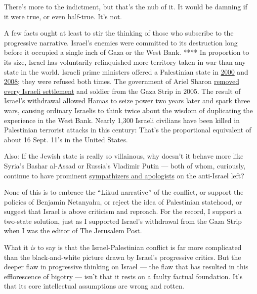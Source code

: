 There's more to the indictment, but that's the nub of it. It would be
damning if it were true, or even half-true. It's not.

A few facts ought at least to stir the thinking of those who subscribe
to the progressive narrative. Israel's enemies were committed to its
destruction long before it occupied a single inch of Gaza or the West
Bank. **** In proportion to its size, Israel has voluntarily
relinquished more territory taken in war than any state in the world.
Israeli prime ministers offered a Palestinian state in
\href{https://www.theguardian.com/world/2002/may/23/israel3}{2000} and
\href{https://www.haaretz.com/1.5014018}{2008}; they were refused both
times. The government of Ariel Sharon
\href{https://www.nytimes.com/2005/08/18/world/middleeast/tearfully-but-forcefully-israel-removes-gaza-settlers.html}{removed
every Israeli settlement} and soldier from the Gaza Strip in 2005. The
result of Israel's withdrawal allowed Hamas to seize power two years
later and spark three wars, causing ordinary Israelis to think twice
about the wisdom of duplicating the experience in the West Bank. Nearly
1,300 Israeli civilians have been killed in Palestinian terrorist
attacks in this century: That's the proportional equivalent of about 16
Sept. 11's in the United States.

Also: If the Jewish state is really so villainous, why doesn't it behave
more like Syria's Bashar al-Assad or Russia's Vladimir Putin --- both of
whom, curiously, continue to have prominent
\href{https://www.haaretz.com/opinion/as-trump-shores-up-assad-regime-u-s-hard-left-cheers-him-on-1.5431962}{sympathizers
and apologists} on the anti-Israel left?

None of this is to embrace the ``Likud narrative'' of the conflict, or
support the policies of Benjamin Netanyahu, or reject the idea of
Palestinian statehood, or suggest that Israel is above criticism and
reproach. For the record, I support a two-state solution, just as I
supported Israel's withdrawal from the Gaza Strip when I was the editor
of The Jerusalem Post.

What it \emph{is} to say is that the Israel-Palestinian conflict is far
more complicated than the black-and-white picture drawn by Israel's
progressive critics. But the deeper flaw in progressive thinking on
Israel --- the flaw that has resulted in this efflorescence of bigotry
--- isn't that it rests on a faulty factual foundation. It's that its
core intellectual assumptions are wrong and rotten.

